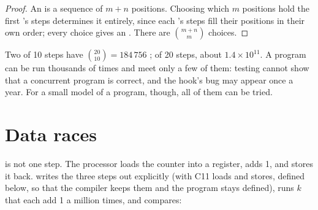 \begin{proof}
An  is a sequence of $m + n$ positions. Choosing which $m$ positions hold the first 's steps
determines it entirely, since each 's steps fill their positions in their own order; every choice gives an
. There are $\binom{m+n}{m}$ choices.
\end{proof}

Two  of 10 steps have $\binom{20}{10} = 184\,756$ ; of 20 steps, about $1.4 \times 10^{11}$. A
program can be run thousands of times and meet only a few of them: testing cannot show that a concurrent program is
correct, and the hook's bug may appear once a year. For a small model of a program, though, all of them can be tried.

\section{Data races}\label{sec:b2:threads-and-synchronisation:races}

 is not one step. The processor loads the counter into a register, adds 1, and stores it back.
 writes the three steps out explicitly (with C11  loads and stores, defined below, so that the compiler keeps them
and the program stays defined), runs $k$  that each add 1 a million times, and compares:


\label{out:b2:threads-and-synchronisation:race}

